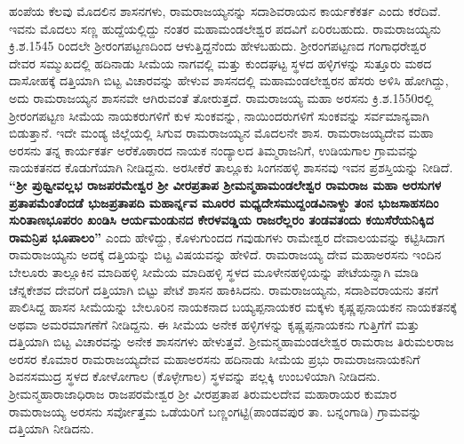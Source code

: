 ಹಂಪೆಯ ಕೆಲವು ಮೊದಲಿನ ಶಾಸನಗಳು, ರಾಮರಾಜಯ್ಯನನ್ನು ಸದಾಶಿವರಾಯನ ಕಾರ್ಯಕೆಕರ್ತ ಎಂದು ಕರೆದಿವೆ. ಇವನು ಮೊದಲು ಸಣ್ಣ ಹುದ್ದೆಯಲ್ಲಿದ್ದು ನಂತರ ಮಹಾಮಂಡಲೇಶ್ವರ ಪದವಿಗೆ ಏರಿರಬಹುದು. ರಾಮರಾಜಯ್ಯನು ಕ್ರಿ.ಶ.1545 ರಿಂದಲೇ ಶ‍್ರೀರಂಗಪಟ್ಟಣದಿಂದ ಆಳುತ್ತಿದ್ದನೆಂದು ಹೇಳಬಹುದು. ಶ‍್ರೀರಂಗಪಟ್ಟಣದ ಗಂಗಾಧರೇಶ್ವರ ದೇವರ ಸಮ್ಮುಖದಲ್ಲಿ ಹದಿನಾಡು ಸೀಮೆಯ ನಾಗವಲ್ಲಿ ಮತ್ತು ಕುಂದಘಟ್ಟ ಸ್ಥಳದ ಹಳ್ಳಿಗಳನ್ನು ಸುತ್ತೂರು ಮಠದ ದಾಸೋಹಕ್ಕೆ ದತ್ತಿಯಾಗಿ ಬಿಟ್ಟ ವಿಚಾರವನ್ನು ಹೇಳುವ ಶಾಸನದಲ್ಲಿ ಮಹಾಮಂಡಲೇಶ್ವರನ ಹೆಸರು ಅಳಿಸಿ ಹೋಗಿದ್ದು, ಅದು ರಾಮರಾಜಯ್ಯನ ಶಾಸನವೇ ಆಗಿರುವಂತೆ ತೋರುತ್ತದೆ. ರಾಮರಾಜಯ್ಯ ಮಹಾ ಅರಸನು ಕ್ರಿ.ಶ.1550ರಲ್ಲಿ ಶ‍್ರೀರಂಗಪಟ್ಟಣ ಸೀಮೆಯ ನಾಯಕರುಗಳಿಗೆ ಕುಳ ಸುಂಕವನ್ನು, ನಾಯಿಂದರುಗಳಿಗೆ ಸುಂಕವನ್ನು ಸರ್ವಮಾನ್ಯವಾಗಿ ಬಿಡುತ್ತಾನೆ. ಇದೇ ಮಂಡ್ಯ ಜಿಲ್ಲೆಯಲ್ಲಿ ಸಿಗುವ ರಾಮರಾಜಯ್ಯನ ಮೊದಲನೇ ಶಾಸ. ರಾಮರಾಜಯ್ಯದೇವ ಮಹಾ ಅರಸನು ತನ್ನ ಕಾರ್ಯಕರ್ತ ಅರೆಕೊಠಾರದ ನಾಯಕ ನಂದ್ಯಾಲದ ತಿಮ್ಮರಾಜನಿಗೆ, ಉಡಿಯಗಾಲ ಗ್ರಾಮವನ್ನು ನಾಯಕತನದ ಕೊಡುಗೆಯಾಗಿ ನೀಡಿದ್ದನು. ಅರಸೀಕೆರೆ ತಾಲ್ಲೂಕು ಸಿಂಗನಹಳ್ಳಿ ಶಾಸನವು ಇವನ ಪ್ರಶಸ್ತಿಯನ್ನು ನೀಡಿದೆ. \textbf{“ಶ‍್ರೀ ಪ್ರುಥ್ವೀವಲ್ಲಭ ರಾಜಪರಮೇಶ್ವರ ಶ‍್ರೀ ವೀರಪ್ರತಾಪ ಶ‍್ರೀಮನ್ಮಹಾಮಂಡಲೇಶ್ವರ ರಾಮರಾಜ ಮಹಾ ಅರಸುಗಳ ಪ್ರತಾಪಮೆಂತೆಂದಡೆ ಭುಜಪ್ರತಾಪದಿ ಮಹಾರ್ನ್ನವ ಮೂರರ ಮಧ್ಯದೇಸಮುದ್ದಂಡವಿನಾಳ್ದು ತಂನ ಭುಜಸಾಹಸದಿಂ ಸುರಿತಾಣಭೂಪರಂ ಖಂಡಿಸಿ ಆರ್ಯಮಂಡುನದ ಕೇರಳವಡ್ಡಿಯ ರಾಜರೆಲ್ಲರಂ ತಂಡವತಂದು ಕಯಿಸೆರೆಯನಿಕ್ಕಿದ ರಾಮನ್ರಿಪ ಭೂಪಾಲಂ”} ಎಂದು ಹೇಳಿದ್ದು, ಕೊಳುಗುಂದದ ಗವುಡುಗಳು ರಾಮೇಶ್ವರ ದೇವಾಲಯವನ್ನು ಕಟ್ಟಿಸಿದಾಗ ರಾಮರಾಜಯ್ಯನು ಅದಕ್ಕೆ ದತ್ತಿಯನ್ನು ಬಿಟ್ಟ ವಿಷಯವನ್ನು ಹೇಳಿದೆ. ರಾಮರಾಜಯ್ಯ ದೇವ ಮಹಾಅರಸನು ಇಂದಿನ ಬೇಲೂರು ತಾಲ್ಲೂಕಿನ ಮಾದಿಹಳ್ಳಿ ಸೀಮೆಯ ಮಾದಿಹಳ್ಳಿ ಸ್ಥಳದ ಮೂಳೇನಹಳ್ಳಿಯನ್ನು ಪೇಟೆಯನ್ನಾಗಿ ಮಾಡಿ ಚೆನ್ನಕೇಶವ ದೇವರಿಗೆ ದತ್ತಿಯಾಗಿ ಬಿಟ್ಟು ಪೇಟೆ ಶಾಸನ ಹಾಕಿಸಿದನು. ರಾಮರಾಜಯ್ಯನು, ಸದಾಶಿವರಾಯನು ತನಗೆ ಪಾಲಿಸಿದ್ದ ಹಾಸನ ಸೀಮೆಯನ್ನು ಬೇಲೂರಿನ ನಾಯಕನಾದ ಬಯ್ಯಪ್ಪನಾಯಕರ ಮಕ್ಕಳು ಕೃಷ್ಣಪ್ಪನಾಯಕನ ನಾಯಕತನಕ್ಕೆ ಅಥವಾ ಅಮರಮಾಗಣೆಗೆ ನೀಡಿದ್ದನು. ಈ ಸೀಮೆಯ ಅನೇಕ ಹಳ್ಳಿಗಳನ್ನು ಕೃಷ್ಣಪ್ಪನಾಯಕನು ಗುತ್ತಿಗೆಗೆ ಮತ್ತು ದತ್ತಿಯಾಗಿ ಬಿಟ್ಟ ವಿಚಾರವನ್ನು ಅನೇಕ ಶಾಸನಗಳು ಹೇಳುತ್ತವೆ. ಶ‍್ರೀಮನ್ಮಹಾಮಂಡಲೇಶ್ವರ ರಾಮರಾಜ ತಿರುಮಲರಾಜ ಅರಸರ ಕೊಮಾರ ರಾಮರಾಜಯ್ಯದೇವ ಮಹಾಅರಸನು ಹದಿನಾಡು ಸೀಮೆಯ ಪ್ರಭು ರಾಮರಾಜನಾಯಕನಿಗೆ ಶಿವನಸಮುದ್ರ ಸ್ಥಳದ ಕೋಳೋಗಾಲ (ಕೊಳ್ಳೇಗಾಲ) ಸ್ಥಳವನ್ನು ಪಲ್ಲಕ್ಕಿ ಉಂಬಳಿಯಾಗಿ ನೀಡಿದನು. ಶ‍್ರೀಮನ್ಮಹಾರಾಜಾಧಿರಾಜ ರಾಜಪರಮೇಶ್ವರ ಶ‍್ರೀ ವೀರಪ್ರತಾಪ ತಿರುಮಲದೇವ ಮಹಾರಾಯರ ಕುಮಾರ ರಾಮರಾಜಯ್ಯ ಅರಸನು ಸರ್ವೋತ್ತಮ ಒಡೆಯರಿಗೆ ಬಣ್ಣಂಗಟ್ಟಿ(ಪಾಂಡವಪುರ ತಾ. ಬನ್ನಂಗಾಡಿ) ಗ್ರಾಮವನ್ನು ದತ್ತಿಯಾಗಿ ನೀಡಿದನು.

